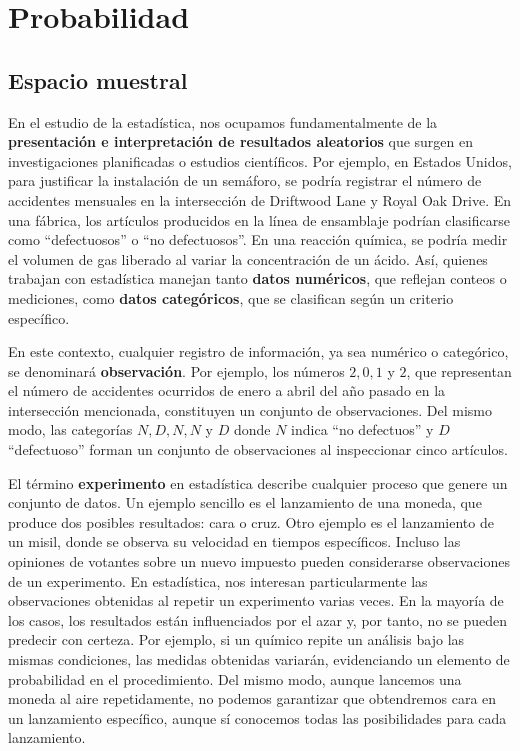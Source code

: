 \chapter{Probabilidad}

\section{Espacio muestral}
En el estudio de la estadística, nos ocupamos fundamentalmente de la \textbf{presentación e interpretación de resultados aleatorios} que surgen en investigaciones planificadas o estudios científicos. Por ejemplo, en Estados Unidos, para justificar la instalación de un semáforo, se podría registrar el número de accidentes mensuales en la intersección de Driftwood Lane y Royal Oak Drive. En una fábrica, los artículos producidos en la línea de ensamblaje podrían clasificarse como ``defectuosos'' o ``no defectuosos''. En una reacción química, se podría medir el volumen de gas liberado al variar la concentración de un ácido. Así, quienes trabajan con estadística manejan tanto \textbf{datos numéricos}, que reflejan conteos o mediciones, como \textbf{datos categóricos}, que se clasifican según un criterio específico.

En este contexto, cualquier registro de información, ya sea numérico o categórico, se denominará \textbf{observación}. Por ejemplo, los números $2, 0, 1$ y $2$, que representan el número de accidentes ocurridos de enero a abril del año pasado en la intersección mencionada, constituyen un conjunto de observaciones. Del mismo modo, las categorías $N, D, N, N$ y $D$ donde $N$ indica ``no defectuos'' y $D$ ``defectuoso'' forman un conjunto de observaciones al inspeccionar cinco artículos.

El término \textbf{experimento} en estadística describe cualquier proceso que genere un conjunto de datos. Un ejemplo sencillo es el lanzamiento de una moneda, que produce dos posibles resultados: cara o cruz. Otro ejemplo es el lanzamiento de un misil, donde se observa su velocidad en tiempos específicos. Incluso las opiniones de votantes sobre un nuevo impuesto pueden considerarse observaciones de un experimento. En estadística, nos interesan particularmente las observaciones obtenidas al repetir un experimento varias veces. En la mayoría de los casos, los resultados están influenciados por el azar y, por tanto, no se pueden predecir con certeza. Por ejemplo, si un químico repite un análisis bajo las mismas condiciones, las medidas obtenidas variarán, evidenciando un elemento de probabilidad en el procedimiento. Del mismo modo, aunque lancemos una moneda al aire repetidamente, no podemos garantizar que obtendremos cara en un lanzamiento específico, aunque sí conocemos todas las posibilidades para cada lanzamiento.

